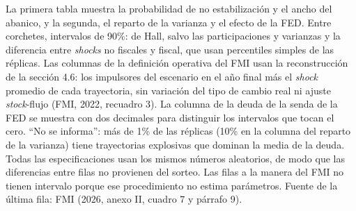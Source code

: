 La primera tabla muestra la probabilidad de no estabilización y el ancho
del abanico, y la segunda, el reparto de la varianza y el efecto de la
FED. Entre corchetes, intervalos de 90\%: de Hall, salvo las
participaciones y varianzas y la diferencia entre \emph{shocks} no
fiscales y fiscal, que usan percentiles simples de las réplicas. Las
columnas de la definición operativa del FMI usan la reconstrucción de la
sección 4.6: los impulsores del escenario en el año final más el
\emph{shock} promedio de cada trayectoria, sin variación del tipo de
cambio real ni ajuste \emph{stock}-flujo (FMI, 2022, recuadro 3). La
columna de la deuda de la senda de la FED se muestra con dos decimales
para distinguir los intervalos que tocan el cero. ``No se informa'': más
de 1\% de las réplicas (10\% en la columna del reparto de la varianza)
tiene trayectorias explosivas que dominan la media de la deuda. Todas
las especificaciones usan los mismos números aleatorios, de modo que las
diferencias entre filas no provienen del sorteo. Las filas a la manera
del FMI no tienen intervalo porque ese procedimiento no estima
parámetros. Fuente de la última fila: FMI (2026, anexo II, cuadro 7 y
párrafo 9).

